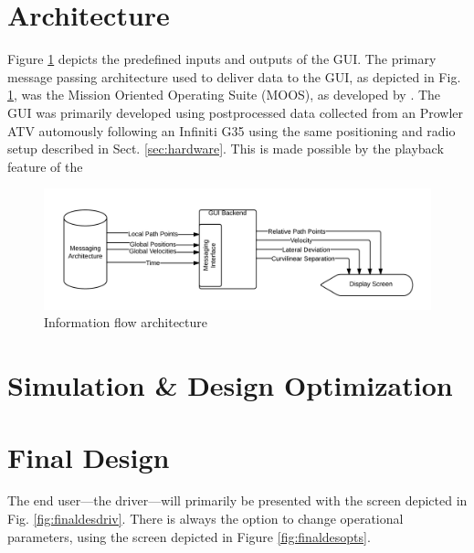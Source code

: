 \documentclass[12pt]{report}
\begin{document}
\section{Architecture}
Figure \ref{fig:blackboxflow} depicts the predefined inputs and outputs of the GUI. The primary message passing architecture used to deliver data to the GUI, as depicted in Fig. \ref{fig:blackboxflow}, was the Mission Oriented Operating Suite (MOOS), as developed by \cite{moos}. The GUI was primarily developed using postprocessed data collected from an Prowler ATV automously following an Infiniti G35 using the same positioning and radio setup described in Sect. \ref{sec:hardware}. This is made possible by the playback feature of the 

\begin{figure}[htbp]
    \centering
    \includegraphics[width=6.5in]{./figs/blackbox_flowchart.png}
    \caption{Information flow architecture}
    \label{fig:blackboxflow}
\end{figure}



\section{Simulation \& Design Optimization}
\label{sec:sim_opt}


\section{Final Design}
\label{sec:finaldes}
The end user---the driver---will primarily be presented with the screen depicted in Fig. \ref{fig:finaldesdriv}. There is always the option to change operational parameters, using the screen depicted in Figure \ref{fig:finaldesopts}.
\end{document}
